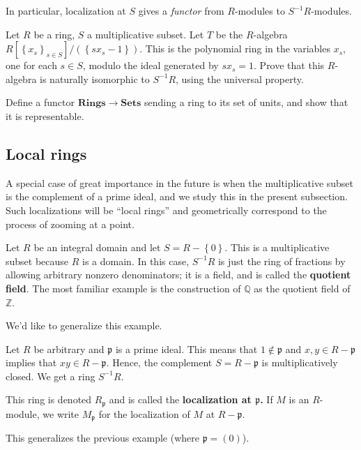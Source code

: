 In particular, localization at $S$ gives a \emph{functor} from $R$-modules to
$S^{-1}R$-modules.

\begin{exercise} 
Let $R$ be a ring, $S$ a multiplicative subset. Let $T$ be the $R$-algebra
$R[\left\{x_s\right\}_{s \in S}]/( \left\{sx_s - 1\right\})$. This is the
polynomial ring in the variables $x_s$, one for each $s \in S$, modulo the
ideal generated by $sx_s  = 1$. Prove that this $R$-algebra is naturally
isomorphic to $S^{-1}R$, using the universal property.
\end{exercise} 

\begin{exercise} Define a functor $\mathbf{Rings} \to \mathbf{Sets}$ sending a ring to
its set of units, and show that it is representable. 
\end{exercise} 
\subsection{Local rings}

A special case of great importance in the future is when the multiplicative
subset is the complement of a prime ideal, and we study this in the present
subsection. Such localizations will be ``local rings'' and geometrically
correspond to the process of zooming at a point.

\begin{example} 
Let $R$ be an integral domain and let $S = R - \left\{0\right\}$. This is a
multiplicative subset because $R$ is a domain.  In this case, $S^{-1}R$ is just
the ring of fractions by allowing arbitrary nonzero denominators; it is a
field, and is called the \textbf{quotient field}. The most familiar example is
the construction of $\mathbb{Q}$ as the quotient field of $\mathbb{Z}$.
\end{example} 

We'd like to generalize this example.  

\begin{example} 
Let $R$ be arbitrary and $\mathfrak{p}$ is a prime ideal.  This means that $1
\notin \mathfrak{p}$ and $x,y \in R - \mathfrak{p}$ implies that $xy \in R -
\mathfrak{p}$. Hence, the complement $S = R- \mathfrak{p}$  is multiplicatively
closed.  We get a ring $S^{-1}R$.

\begin{definition} 
This ring is denoted $R_{\mathfrak{p}}$ and is called the \textbf{localization
at $\mathfrak{p}$.} If $M$ is an $R$-module, we write $M_{\mathfrak{p}}$ for
the localization of $M$ at $R - \mathfrak{p}$.
\end{definition} 
This generalizes the previous example (where $\mathfrak{p} = (0)$).
\end{example} 

